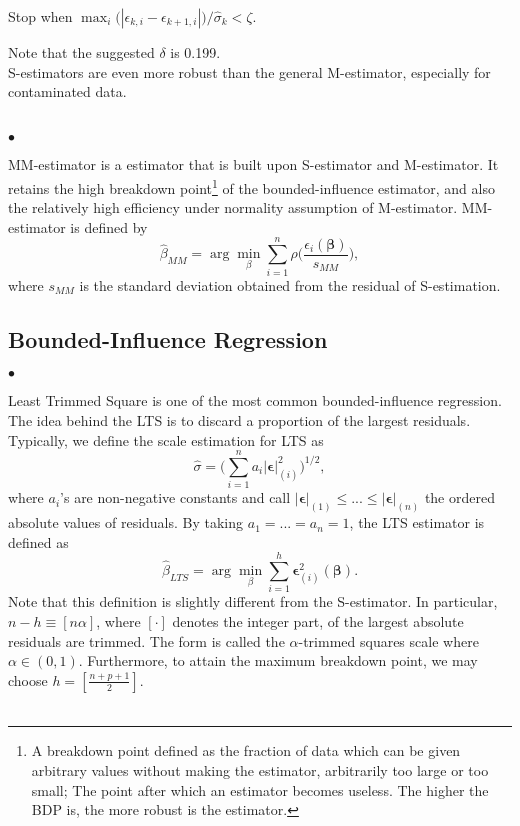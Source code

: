 \documentclass[conference]{IEEEtran}
\begin{document}
\noindent {} Stop when $\max_i \bigg( |\epsilon_{k,i} - \epsilon_{k+1,i}| \bigg)/ \hat{\sigma}_k < \zeta.$ 

Note that the suggested $\delta$ is 0.199. \\

S-estimators are even more robust than the general M-estimator, especially for contaminated data. \\~

\noindent $\bullet$ 

MM-estimator is a estimator that is built upon S-estimator and M-estimator. It retains the high breakdown point\footnote{A breakdown point defined as the fraction of data which can be given arbitrary values without making the estimator, arbitrarily too large or too small; The point after which an estimator becomes useless. The higher the BDP is, the more robust is the estimator.} of the bounded-influence estimator, and also the relatively high efficiency under normality assumption of M-estimator.
MM-estimator is defined by
$$ \hat{\beta}_{MM}=\arg \min_{\beta}\sum_{i=1}^{n} \rho \bigg(\frac{\epsilon_{i}(\mathbold{\beta})}{s_{MM}} \bigg),$$ 
\noindent where $s_{MM}$ is the standard deviation obtained from the residual of S-estimation.

\subsection{Bounded-Influence Regression}

\noindent $\bullet$ 

Least Trimmed Square is one of the most common  bounded-influence regression. The idea behind the LTS is to discard a proportion of the largest residuals. Typically, we define the scale estimation for LTS as 
$$\hat{\sigma} = \bigg(\sum_{i=1}^{n} a_i |\mathbold{\epsilon}|^2_{(i)} \bigg)^{1/2},$$
\noindent where $a_i$'s are non-negative constants and call $|\mathbold{\epsilon}|_{(1)} \leq ... \leq |\mathbold{\epsilon}|_{(n)}$ the ordered absolute values of residuals. By taking $a_1 = ... = a_n = 1$, the LTS estimator is defined as
$$\hat{\beta}_{LTS} = \arg \min_{\beta}\sum_{i=1}^{h} \mathbold{\epsilon}^2_{(i)}(\mathbold{\beta}).$$
Note that this definition is slightly different from the S-estimator. In particular, $n - h \equiv [n \alpha]$, where $[\cdot]$ denotes the integer part, of the largest absolute residuals are trimmed. The form is called the $\alpha$-trimmed squares scale where $\alpha \in (0, 1)$. Furthermore, to attain the maximum breakdown point, we may choose $h = [\frac{n+p+1}{2}]$. \\~
\end{document}
